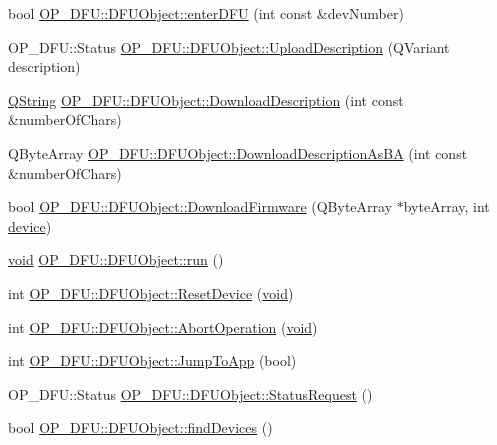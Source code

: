 \begin{DoxyCompactItemize}
\item 
bool \hyperlink{group___uploader_ga64ed24565b35c4530dd2614cc98f38cd}{\-O\-P\-\_\-\-D\-F\-U\-::\-D\-F\-U\-Object\-::enter\-D\-F\-U} (int const \&dev\-Number)
\item 
\-O\-P\-\_\-\-D\-F\-U\-::\-Status \hyperlink{group___uploader_ga6513c6ff0fee1f11aebd6312296e6ed6}{\-O\-P\-\_\-\-D\-F\-U\-::\-D\-F\-U\-Object\-::\-Upload\-Description} (\-Q\-Variant description)
\item 
\hyperlink{group___u_a_v_objects_plugin_gab9d252f49c333c94a72f97ce3105a32d}{\-Q\-String} \hyperlink{group___uploader_ga5c3ae32c69bac4c663f6be430da1db3d}{\-O\-P\-\_\-\-D\-F\-U\-::\-D\-F\-U\-Object\-::\-Download\-Description} (int const \&number\-Of\-Chars)
\item 
\-Q\-Byte\-Array \hyperlink{group___uploader_gaa0f76d47015fa313a0bcf555bb0e690b}{\-O\-P\-\_\-\-D\-F\-U\-::\-D\-F\-U\-Object\-::\-Download\-Description\-As\-B\-A} (int const \&number\-Of\-Chars)
\item 
bool \hyperlink{group___uploader_ga8b88c71b81cbe00fe29938ac9b8a6dcf}{\-O\-P\-\_\-\-D\-F\-U\-::\-D\-F\-U\-Object\-::\-Download\-Firmware} (\-Q\-Byte\-Array $\ast$byte\-Array, int \hyperlink{struct_o_p___d_f_u_1_1device}{device})
\item 
\hyperlink{group___u_a_v_objects_plugin_ga444cf2ff3f0ecbe028adce838d373f5c}{void} \hyperlink{group___uploader_gadb19927303aa24b5505dce3adbb532a2}{\-O\-P\-\_\-\-D\-F\-U\-::\-D\-F\-U\-Object\-::run} ()
\item 
int \hyperlink{group___uploader_gafbdc3dede843764690ebd5bc074ff5dd}{\-O\-P\-\_\-\-D\-F\-U\-::\-D\-F\-U\-Object\-::\-Reset\-Device} (\hyperlink{group___u_a_v_objects_plugin_ga444cf2ff3f0ecbe028adce838d373f5c}{void})
\item 
int \hyperlink{group___uploader_gaa448917a297dd634c2ab4d760a6c402d}{\-O\-P\-\_\-\-D\-F\-U\-::\-D\-F\-U\-Object\-::\-Abort\-Operation} (\hyperlink{group___u_a_v_objects_plugin_ga444cf2ff3f0ecbe028adce838d373f5c}{void})
\item 
int \hyperlink{group___uploader_gad6165621f503c5767306199a8606edaf}{\-O\-P\-\_\-\-D\-F\-U\-::\-D\-F\-U\-Object\-::\-Jump\-To\-App} (bool)
\item 
\-O\-P\-\_\-\-D\-F\-U\-::\-Status \hyperlink{group___uploader_gadd798371bcb5c155ef215f5a77316471}{\-O\-P\-\_\-\-D\-F\-U\-::\-D\-F\-U\-Object\-::\-Status\-Request} ()
\item 
bool \hyperlink{group___uploader_ga09f55b9de769e32ad728223294a8a500}{\-O\-P\-\_\-\-D\-F\-U\-::\-D\-F\-U\-Object\-::find\-Devices} ()

\end{DoxyCompactItemize}

